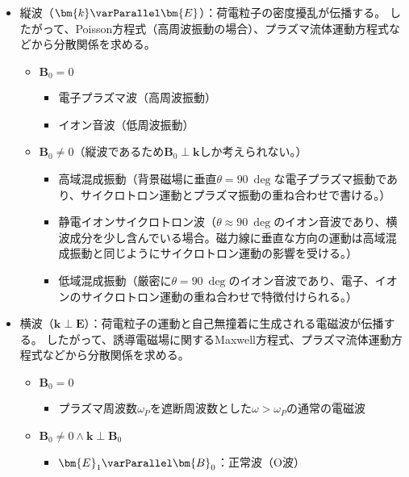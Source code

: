 \begin{itemize}
	\item 縦波（$\bm{k}\varParallel \bm{E}$）：{\color{red}荷電粒子の密度擾乱}が伝播する。
	      したがって、{\color{red}Poisson方程式}（高周波振動の場合）、{\color{red}プラズマ流体運動方程式}などから分散関係を求める。
	      \begin{itemize}
		      \item $\bm{B}_0 = 0$
		            \begin{itemize}
			            \item 電子プラズマ波（高周波振動）
			            \item イオン音波（低周波振動）
		            \end{itemize}
		      \item $\bm{B}_0 \neq 0$（縦波であるため$\bm{B}_0\perp\bm{k}$しか考えられない。）
		            \begin{itemize}
			            \item 高域混成振動（背景磁場に垂直$\theta=\SI{90}{\deg}$な電子プラズマ振動であり、サイクロトロン運動とプラズマ振動の重ね合わせで書ける。）
			            \item 静電イオンサイクロトロン波（$\theta\approx \SI{90}{\deg}$のイオン音波であり、横波成分を少し含んでいる場合。磁力線に垂直な方向の運動は高域混成振動と同じようにサイクロトロン運動の影響を受ける。）
			            \item 低域混成振動（厳密に$\theta = \SI{90}{\deg}$のイオン音波であり、電子、イオンのサイクロトロン運動の重ね合わせで特徴付けられる。）
		            \end{itemize}
	      \end{itemize}
	\item 横波（$\bm{k}\perp \bm{E}$）：{\color{red}荷電粒子の運動と自己無撞着に生成される電磁波}が伝播する。
	      したがって、{\color{red}誘導電磁場に関するMaxwell方程式}、{\color{red}プラズマ流体運動方程式}などから分散関係を求める。
	      \begin{itemize}
		      \item $\bm{B}_0 = 0$
		            \begin{itemize}
			            \item プラズマ周波数$\omega_P$を遮断周波数とした$\omega > \omega_P$の通常の電磁波
		            \end{itemize}
		      \item $\bm{B}_0 \neq 0 \wedge \bm{k}\perp \bm{B}_0$
		            \begin{itemize}
			            \item $\bm{E}_1 \varParallel \bm{B}_0$：正常波（O波）

\end{itemize}
\end{itemize}
\end{itemize}
